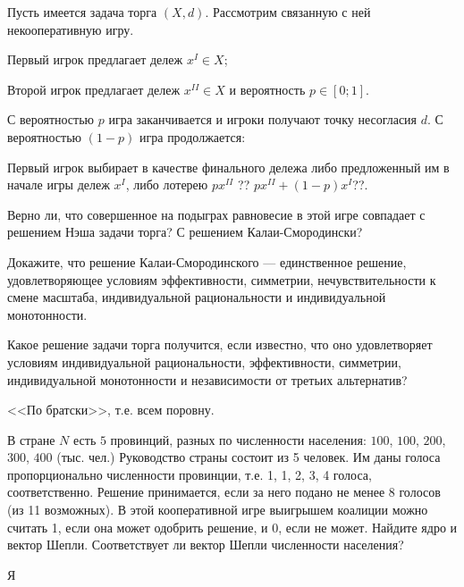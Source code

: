 \begin{problem}
 Пусть имеется задача торга $(X,d).$ Рассмотрим связанную
с ней некооперативную игру.

Первый игрок предлагает дележ $x^{I}\in X$;

Второй игрок предлагает дележ $x^{II}\in X$ и вероятность $p\in[0;1]$.

С вероятностью $p$ игра заканчивается и игроки получают точку несогласия
$d$. С вероятностью $(1-p)$ игра продолжается:

Первый игрок выбирает в качестве финального дележа либо предложенный
им в начале игры дележ $x^{I}$, либо лотерею $px^{II}$ {\red ?? $px^{II}+(1-p)x^{I}$??}.

Верно ли, что совершенное на подыграх равновесие в этой игре совпадает
с решением Нэша задачи торга? С решением Калаи-Смородински?



\begin{sol}

\end{sol}
\end{problem}



\begin{problem}
Докажите, что решение Калаи-Смородинского --- единственное
решение, удовлетворяющее условиям эффективности, симметрии, нечувствительности
к смене масштаба, индивидуальной рациональности и индивидуальной монотонности.



\begin{sol}

\end{sol}
\end{problem}



\begin{problem}
Какое решение задачи торга получится, если известно, что оно удовлетворяет
условиям индивидуальной рациональности, эффективности, симметрии,
индивидуальной монотонности и независимости от третьих альтернатив?



\begin{sol}
<<По братски>>, т.е. всем поровну.
\end{sol}
\end{problem}

\begin{problem}
В стране $N$ есть $5$ провинций, разных по численности населения: $100$, $100$, $200$, $300$, $400$ (тыс. чел.) Руководство страны состоит из 5 человек. Им даны голоса пропорционально
численности провинции, т.е. 1, 1, 2, 3, 4 голоса, соответственно. Решение принимается,
если за него подано не менее 8 голосов (из 11 возможных). В этой кооперативной игре
выигрышем коалиции можно считать 1, если она может одобрить решение, и 0, если не
может. Найдите ядро и вектор Шепли. Соответствует ли вектор Шепли численности населения?

\begin{sol}
Я\end{sol}


\end{problem}

